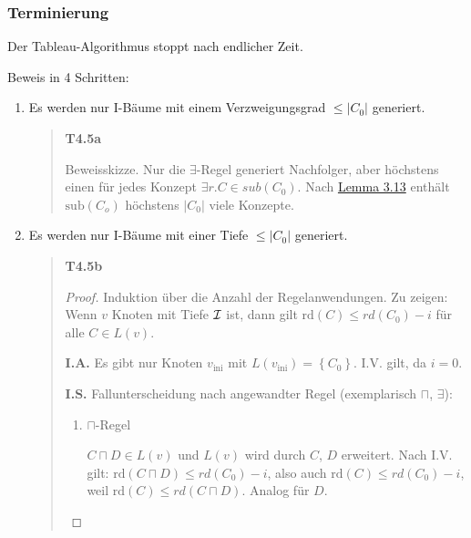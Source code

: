 \setcounter{definition}{4}

\subsubsection{Terminierung}

\begin{proposition}

Der Tableau-Algorithmus stoppt nach endlicher Zeit.
\end{proposition}
\setcounter{definition}{6}

Beweis in 4 Schritten:

\begin{enumerate}
\def\labelenumi{\arabic{enumi}.}
\item
  Es werden nur I-Bäume mit einem Verzweigungsgrad
  $\leq \left| C_{0} \right|$ generiert.

\begin{quote}
\textbf{T4.5a}

Beweisskizze. Nur die $\exists$-Regel generiert Nachfolger, aber
höchstens einen für jedes Konzept $\exists r.C \in sub(C_{0})$. Nach
\protect\hyperlink{lemma-3.13}{Lemma 3.13} enthält
$\text{sub}\left( C_{o} \right)$ höchstens $\left| C_{0} \right|$
viele Konzepte.
\end{quote}

\def\labelenumi{\arabic{enumi}.}
\item
  Es werden nur I-Bäume mit einer Tiefe $\leq \left| C_{0} \right|$
  generiert.

\begin{quote}
\textbf{T4.5b}
\begin{proof}

Induktion über die Anzahl der Regelanwendungen. Zu zeigen: Wenn $v$
Knoten mit Tiefe $\mathcal{I}$ ist, dann gilt
$\text{rd}\left( C \right) \leq rd\left( C_{0} \right) - i$ für alle
$C \in L\left( v \right)$.

\textbf{I.A.} Es gibt nur Knoten $v_{\text{ini}}$ mit
$L\left( v_{\text{ini}} \right) = \left\{ C_{0} \right\}$. I.V. gilt,
da $i = 0$.

\textbf{I.S.} Fallunterscheidung nach angewandter Regel (exemplarisch
$\sqcap$, $\exists$):

\begin{enumerate}
\def\labelenumi{\alph{enumi}.}
\item
  $\sqcap$-Regel

$C \sqcap D \in L(v)$ und $L(v)$ wird durch $C$, $D$ erweitert.
Nach I.V. gilt:
$\text{rd}\left( C \sqcap D \right) \leq rd\left( C_{0} \right) - i$,
also auch $\text{rd}\left( C \right) \leq rd\left( C_{0} \right) - i$,
weil $\text{rd}\left( C \right) \leq rd\left( C \sqcap D \right)$.
Analog für $D$.


\end{enumerate}
\end{proof}
\end{quote}
\end{enumerate}
